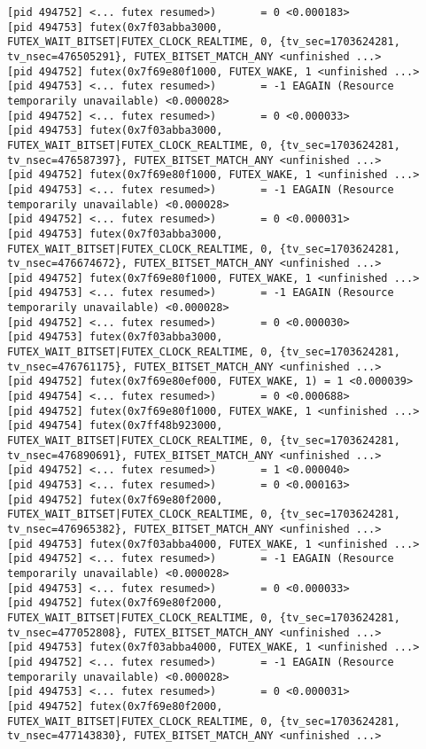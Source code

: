 \documentclass[a4paper, 12pt]{article}
\begin{document}
\begin{lstlisting}
[pid 494752] <... futex resumed>)       = 0 <0.000183>
[pid 494753] futex(0x7f03abba3000, FUTEX_WAIT_BITSET|FUTEX_CLOCK_REALTIME, 0, {tv_sec=1703624281, tv_nsec=476505291}, FUTEX_BITSET_MATCH_ANY <unfinished ...>
[pid 494752] futex(0x7f69e80f1000, FUTEX_WAKE, 1 <unfinished ...>
[pid 494753] <... futex resumed>)       = -1 EAGAIN (Resource temporarily unavailable) <0.000028>
[pid 494752] <... futex resumed>)       = 0 <0.000033>
[pid 494753] futex(0x7f03abba3000, FUTEX_WAIT_BITSET|FUTEX_CLOCK_REALTIME, 0, {tv_sec=1703624281, tv_nsec=476587397}, FUTEX_BITSET_MATCH_ANY <unfinished ...>
[pid 494752] futex(0x7f69e80f1000, FUTEX_WAKE, 1 <unfinished ...>
[pid 494753] <... futex resumed>)       = -1 EAGAIN (Resource temporarily unavailable) <0.000028>
[pid 494752] <... futex resumed>)       = 0 <0.000031>
[pid 494753] futex(0x7f03abba3000, FUTEX_WAIT_BITSET|FUTEX_CLOCK_REALTIME, 0, {tv_sec=1703624281, tv_nsec=476674672}, FUTEX_BITSET_MATCH_ANY <unfinished ...>
[pid 494752] futex(0x7f69e80f1000, FUTEX_WAKE, 1 <unfinished ...>
[pid 494753] <... futex resumed>)       = -1 EAGAIN (Resource temporarily unavailable) <0.000028>
[pid 494752] <... futex resumed>)       = 0 <0.000030>
[pid 494753] futex(0x7f03abba3000, FUTEX_WAIT_BITSET|FUTEX_CLOCK_REALTIME, 0, {tv_sec=1703624281, tv_nsec=476761175}, FUTEX_BITSET_MATCH_ANY <unfinished ...>
[pid 494752] futex(0x7f69e80ef000, FUTEX_WAKE, 1) = 1 <0.000039>
[pid 494754] <... futex resumed>)       = 0 <0.000688>
[pid 494752] futex(0x7f69e80f1000, FUTEX_WAKE, 1 <unfinished ...>
[pid 494754] futex(0x7ff48b923000, FUTEX_WAIT_BITSET|FUTEX_CLOCK_REALTIME, 0, {tv_sec=1703624281, tv_nsec=476890691}, FUTEX_BITSET_MATCH_ANY <unfinished ...>
[pid 494752] <... futex resumed>)       = 1 <0.000040>
[pid 494753] <... futex resumed>)       = 0 <0.000163>
[pid 494752] futex(0x7f69e80f2000, FUTEX_WAIT_BITSET|FUTEX_CLOCK_REALTIME, 0, {tv_sec=1703624281, tv_nsec=476965382}, FUTEX_BITSET_MATCH_ANY <unfinished ...>
[pid 494753] futex(0x7f03abba4000, FUTEX_WAKE, 1 <unfinished ...>
[pid 494752] <... futex resumed>)       = -1 EAGAIN (Resource temporarily unavailable) <0.000028>
[pid 494753] <... futex resumed>)       = 0 <0.000033>
[pid 494752] futex(0x7f69e80f2000, FUTEX_WAIT_BITSET|FUTEX_CLOCK_REALTIME, 0, {tv_sec=1703624281, tv_nsec=477052808}, FUTEX_BITSET_MATCH_ANY <unfinished ...>
[pid 494753] futex(0x7f03abba4000, FUTEX_WAKE, 1 <unfinished ...>
[pid 494752] <... futex resumed>)       = -1 EAGAIN (Resource temporarily unavailable) <0.000028>
[pid 494753] <... futex resumed>)       = 0 <0.000031>
[pid 494752] futex(0x7f69e80f2000, FUTEX_WAIT_BITSET|FUTEX_CLOCK_REALTIME, 0, {tv_sec=1703624281, tv_nsec=477143830}, FUTEX_BITSET_MATCH_ANY <unfinished ...>

\end{lstlisting}
\end{document}
